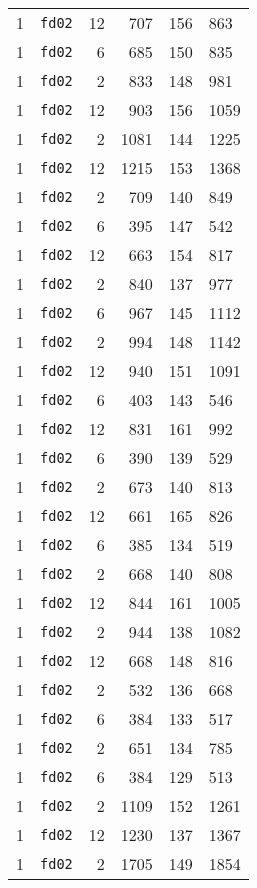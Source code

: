 \documentclass{article}
\begin{document}
\begin{table}[h!]
\begin{tabular}{llrrrl}
    1 & \texttt{fd02} & 12 & 707 & 156 & 863 \\
    1 & \texttt{fd02} & 6 & 685 & 150 & 835 \\
    1 & \texttt{fd02} & 2 & 833 & 148 & 981 \\
    1 & \texttt{fd02} & 12 & 903 & 156 & 1059 \\
    1 & \texttt{fd02} & 2 & 1081 & 144 & 1225 \\
    1 & \texttt{fd02} & 12 & 1215 & 153 & 1368 \\
    1 & \texttt{fd02} & 2 & 709 & 140 & 849 \\
    1 & \texttt{fd02} & 6 & 395 & 147 & 542 \\
    1 & \texttt{fd02} & 12 & 663 & 154 & 817 \\
    1 & \texttt{fd02} & 2 & 840 & 137 & 977 \\
    1 & \texttt{fd02} & 6 & 967 & 145 & 1112 \\
    1 & \texttt{fd02} & 2 & 994 & 148 & 1142 \\
    1 & \texttt{fd02} & 12 & 940 & 151 & 1091 \\
    1 & \texttt{fd02} & 6 & 403 & 143 & 546 \\
    1 & \texttt{fd02} & 12 & 831 & 161 & 992 \\
    1 & \texttt{fd02} & 6 & 390 & 139 & 529 \\
    1 & \texttt{fd02} & 2 & 673 & 140 & 813 \\
    1 & \texttt{fd02} & 12 & 661 & 165 & 826 \\
    1 & \texttt{fd02} & 6 & 385 & 134 & 519 \\
    1 & \texttt{fd02} & 2 & 668 & 140 & 808 \\
    1 & \texttt{fd02} & 12 & 844 & 161 & 1005 \\
    1 & \texttt{fd02} & 2 & 944 & 138 & 1082 \\
    1 & \texttt{fd02} & 12 & 668 & 148 & 816 \\
    1 & \texttt{fd02} & 2 & 532 & 136 & 668 \\
    1 & \texttt{fd02} & 6 & 384 & 133 & 517 \\
    1 & \texttt{fd02} & 2 & 651 & 134 & 785 \\
    1 & \texttt{fd02} & 6 & 384 & 129 & 513 \\
    1 & \texttt{fd02} & 2 & 1109 & 152 & 1261 \\
    1 & \texttt{fd02} & 12 & 1230 & 137 & 1367 \\
    1 & \texttt{fd02} & 2 & 1705 & 149 & 1854 \\

\end{tabular}
\end{table}
\end{document}
